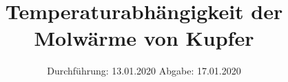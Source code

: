 
\usepackage{longtable}
\usepackage{wrapfig}
\usepackage{ dsfont }
\subject{VERSUCH 47}
\title{Temperaturabhängigkeit der Molwärme von Kupfer}
\date{%
  \hspace{-2.5em}
  Durchführung: 13.01.2020
  \hspace{4em}
  Abgabe: 17.01.2020
}


  \setlength{\parindent}{0em}
  \maketitle
  \thispagestyle{empty}
  \newpage
  \tableofcontents
  \newpage

%



\printbibliography{}
%


